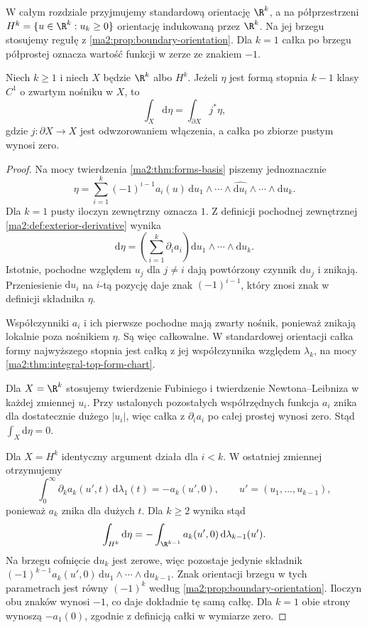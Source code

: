 W całym rozdziale przyjmujemy standardową orientację
$\R^k$, a na półprzestrzeni
$H^k=\{u\in\R^k:u_k\ge0\}$ orientację indukowaną
przez $\R^k$. Na jej brzegu stosujemy regułę
z \ref{ma2:prop:boundary-orientation}.
Dla $k=1$ całka po brzegu półprostej oznacza
wartość funkcji w zerze ze znakiem $-1$.

\begin{lemat}
\label{ma2:lem:stokes-local}
Niech $k\ge1$ i niech $X$ będzie $\R^k$ albo $H^k$.
Jeżeli $\eta$ jest formą stopnia $k-1$ klasy $C^1$
o zwartym nośniku w $X$, to
\[
 \int_X\mathrm d\eta=\int_{\partial X}j^*\eta,
\]
gdzie $j:\partial X\to X$ jest odwzorowaniem
włączenia, a całka po zbiorze pustym wynosi zero.
\end{lemat}
\begin{proof}
Na mocy twierdzenia \ref{ma2:thm:forms-basis}
piszemy jednoznacznie
\[
 \eta=\sum_{i=1}^k(-1)^{i-1}a_i(u)
 \,\mathrm du_1\wedge\cdots\wedge
 \widehat{\mathrm du_i}\wedge\cdots\wedge\mathrm du_k.
\]
Dla $k=1$ pusty iloczyn zewnętrzny oznacza $1$.
Z definicji pochodnej zewnętrznej
\ref{ma2:def:exterior-derivative}
wynika
\[
 \mathrm d\eta=\left(\sum_{i=1}^k\partial_i a_i\right)
 \mathrm du_1\wedge\cdots\wedge\mathrm du_k.
\]
Istotnie, pochodne względem $u_j$ dla $j\ne i$
dają powtórzony czynnik $\mathrm du_j$ i znikają.
Przeniesienie $\mathrm du_i$ na $i$-tą pozycję
daje znak $(-1)^{i-1}$, który znosi znak
w definicji składnika $\eta$.

Współczynniki $a_i$ i ich pierwsze pochodne
mają zwarty nośnik, ponieważ znikają lokalnie
poza nośnikiem $\eta$. Są więc całkowalne.
W standardowej orientacji całka formy
najwyższego stopnia jest całką z jej współczynnika
względem $\lambda_k$, na mocy
\ref{ma2:thm:integral-top-form-chart}.

Dla $X=\R^k$ stosujemy twierdzenie Fubiniego
i twierdzenie Newtona--Leibniza w każdej zmiennej
$u_i$. Przy ustalonych pozostałych współrzędnych
funkcja $a_i$ znika dla dostatecznie dużego
$|u_i|$, więc całka z $\partial_i a_i$
po całej prostej wynosi zero.
Stąd $\int_X\mathrm d\eta=0$.

Dla $X=H^k$ identyczny argument działa dla $i<k$.
W ostatniej zmiennej otrzymujemy
\[
 \int_0^\infty \partial_k a_k(u',t)
 \,\mathrm d\lambda_1(t)=-a_k(u',0),
 \qquad u'=(u_1,\ldots,u_{k-1}),
\]
ponieważ $a_k$ znika dla dużych $t$.
Dla $k\ge2$ wynika stąd
\[
 \int_{H^k}\mathrm d\eta
 =-\int_{\R^{k-1}}a_k(u',0)\,\mathrm d\lambda_{k-1}(u').
\]
Na brzegu cofnięcie $\mathrm du_k$ jest zerowe,
więc pozostaje jedynie składnik
$(-1)^{k-1}a_k(u',0)\,
\mathrm du_1\wedge\cdots\wedge\mathrm du_{k-1}$.
Znak orientacji brzegu w tych parametrach
jest równy $(-1)^k$ według
\ref{ma2:prop:boundary-orientation}.
Iloczyn obu znaków wynosi $-1$, co daje
dokładnie tę samą całkę.
Dla $k=1$ obie strony wynoszą $-a_1(0)$,
zgodnie z definicją całki w wymiarze zero.
\end{proof}

